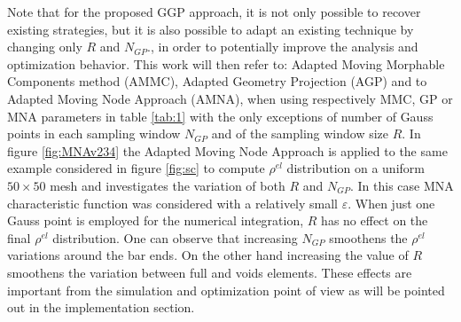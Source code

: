 Note that for the proposed GGP approach, it is not only possible to recover existing strategies, but it is also possible to adapt an existing technique by changing only $R$ and $N_{GP}$., in order to potentially improve the analysis and optimization behavior.
  This work will then refer to: Adapted Moving Morphable Components method (AMMC), Adapted Geometry Projection (AGP) and to Adapted Moving Node Approach (AMNA), when using respectively MMC, GP or MNA parameters in table \ref{tab:1} with the only exceptions of  number of Gauss points in each sampling window $N_{GP}$ and of the sampling window size $R$. In figure \ref{fig:MNAv234} the Adapted Moving Node Approach is applied to the same example considered in figure \ref{fig:sc} to compute $\rho^{el}$ distribution on a uniform $50\times 50$ mesh and investigates the variation of both $R$ and $N_{GP}$.
  In this case MNA characteristic function was considered with a relatively small $\varepsilon$. When just one Gauss point is employed for the numerical integration, $R$ has no effect on the final $\rho^{el}$ distribution. One can observe that increasing $N_{GP}$ smoothens the $\rho^{el}$ variations around the bar ends. On the other hand increasing the value of $R$ smoothens the variation between full and voids elements. These effects are important from the simulation and optimization point of view as will be pointed out in the implementation section.

